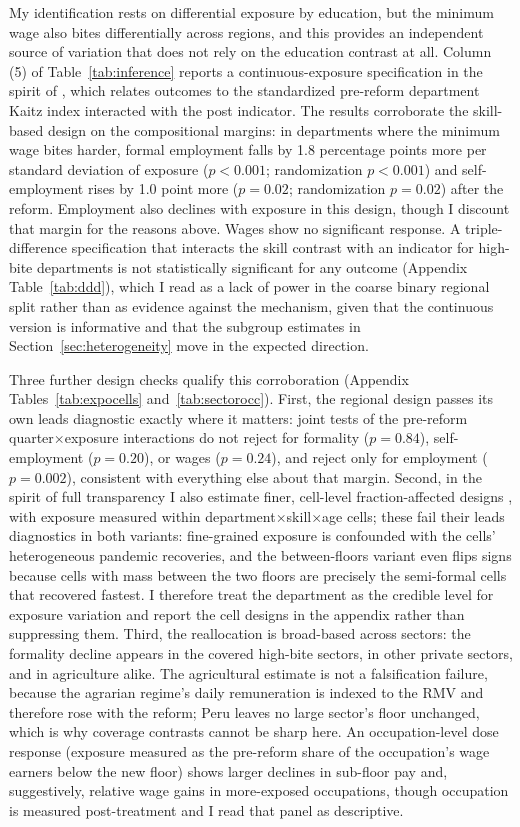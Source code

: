 My identification rests on differential exposure by education, but the minimum wage also bites differentially across regions, and this provides an independent source of variation that does not rely on the education contrast at all. Column (5) of Table~\ref{tab:inference} reports a continuous-exposure specification in the spirit of \citet{card_1992}, which relates outcomes to the standardized pre-reform department Kaitz index interacted with the post indicator. The results corroborate the skill-based design on the compositional margins: in departments where the minimum wage bites harder, formal employment falls by 1.8 percentage points more per standard deviation of exposure ($p<0.001$; randomization $p<0.001$) and self-employment rises by 1.0 point more ($p=0.02$; randomization $p=0.02$) after the reform. Employment also declines with exposure in this design, though I discount that margin for the reasons above. Wages show no significant response. A triple-difference specification that interacts the skill contrast with an indicator for high-bite departments is not statistically significant for any outcome (Appendix Table~\ref{tab:ddd}), which I read as a lack of power in the coarse binary regional split rather than as evidence against the mechanism, given that the continuous version is informative and that the subgroup estimates in Section~\ref{sec:heterogeneity} move in the expected direction.

Three further design checks qualify this corroboration (Appendix Tables~\ref{tab:expocells} and~\ref{tab:sectorocc}). First, the regional design passes its own leads diagnostic exactly where it matters: joint tests of the pre-reform quarter$\times$exposure interactions do not reject for formality ($p=0.84$), self-employment ($p=0.20$), or wages ($p=0.24$), and reject only for employment ($p=0.002$), consistent with everything else about that margin. Second, in the spirit of full transparency I also estimate finer, cell-level fraction-affected designs \citep{card_1992, clemens_wither_2019}, with exposure measured within department$\times$skill$\times$age cells; these fail their leads diagnostics in both variants: fine-grained exposure is confounded with the cells' heterogeneous pandemic recoveries, and the between-floors variant even flips signs because cells with mass between the two floors are precisely the semi-formal cells that recovered fastest. I therefore treat the department as the credible level for exposure variation and report the cell designs in the appendix rather than suppressing them. Third, the reallocation is broad-based across sectors: the formality decline appears in the covered high-bite sectors, in other private sectors, and in agriculture alike. The agricultural estimate is not a falsification failure, because the agrarian regime's daily remuneration is indexed to the RMV and therefore rose with the reform; Peru leaves no large sector's floor unchanged, which is why coverage contrasts cannot be sharp here. An occupation-level dose response (exposure measured as the pre-reform share of the occupation's wage earners below the new floor) shows larger declines in sub-floor pay and, suggestively, relative wage gains in more-exposed occupations, though occupation is measured post-treatment and I read that panel as descriptive.

